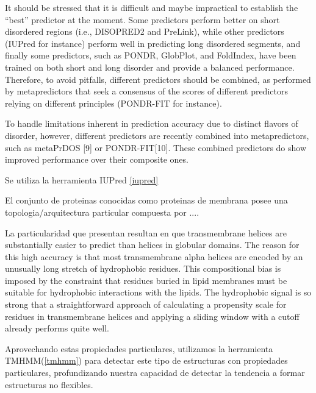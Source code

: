 It should be stressed that it is difficult and maybe impractical to establish the “best” predictor at the moment. Some predictors perform
better on short disordered regions (i.e., DISOPRED2 and PreLink), while other predictors (IUPred for instance) perform well in predicting long disordered segments, and finally some
predictors, such as PONDR, GlobPlot, and FoldIndex, have been trained on both short and long disorder and provide a balanced performance. 
Therefore, to avoid pitfalls, different predictors should be combined, as performed by metapredictors that seek a consensus of the scores of different predictors relying on different
principles (PONDR-FIT for instance).

To handle limitations inherent in prediction accuracy due to distinct flavors of disorder, however, different predictors are recently combined into metapredictors, such as metaPrDOS [9] or PONDR-FIT[10]. 
These combined predictors do show improved performance over their composite ones.

Se utiliza la herramienta IUPred \ref{iupred}




El conjunto de proteinas conocidas como proteinas de membrana posee una topologia/arquitectura particular compuesta por ....

La particularidad que presentan resultan en que transmembrane helices are substantially easier to predict than helices in globular domains.
The reason for this high accuracy is that most transmembrane alpha helices are encoded by an unusually long stretch of
hydrophobic residues. This compositional bias is imposed by the constraint that residues buried in lipid membranes
must be suitable for hydrophobic interactions with the lipids.
The hydrophobic signal is so strong that a straightforward approach of calculating a propensity scale for residues in
transmembrane helices and applying a sliding window with a cutoff already performs quite well.

Aprovechando estas propiedades particulares, utilizamos la herramienta TMHMM(\ref{tmhmm}) para detectar este tipo de estructuras con propiedades particulares, profundizando nuestra capacidad de detectar la tendencia a formar estructuras no flexibles.




